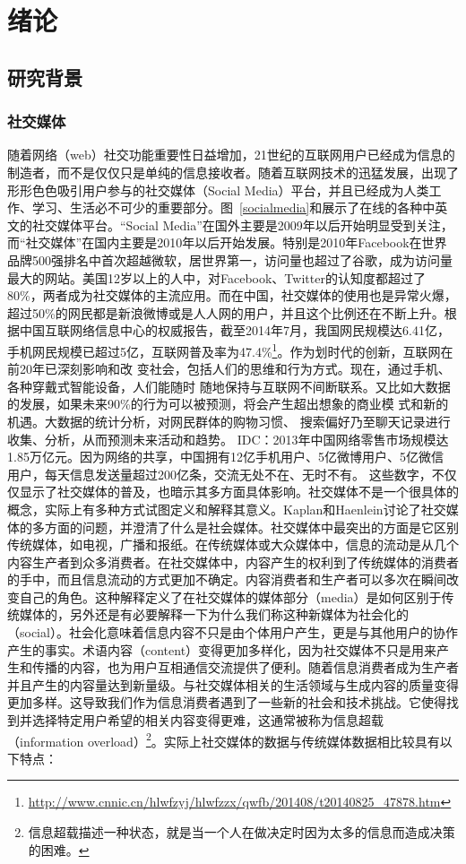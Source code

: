 \chapter{绪论}
\label{Intro}

\section{研究背景}

\subsection{社交媒体}
随着网络（web）社交功能重要性日益增加，21世纪的互联网用户已经成为信息的制造者，而不是仅仅只是单纯的信息接收者。随着互联网技术的迅猛发展，出现了形形色色吸引用户参与的社交媒体（Social Media）平台，并且已经成为人类工作、学习、生活必不可少的重要部分。图~\ref{socialmedia}和展示了在线的各种中英文的社交媒体平台。“Social Media”在国外主要是2009年以后开始明显受到关注，而“社交媒体”在国内主要是2010年以后开始发展。特别是2010年Facebook在世界品牌500强排名中首次超越微软，居世界第一，访问量也超过了谷歌，成为访问量最大的网站。美国12岁以上的人中，对Facebook、Twitter的认知度都超过了80\%，两者成为社交媒体的主流应用。而在中国，社交媒体的使用也是异常火爆，超过50\%的网民都是新浪微博或是人人网的用户，并且这个比例还在不断上升。根据中国互联网络信息中心的权威报告，截至2014年7月，我国网民规模达6.41亿，手机网民规模已超过5亿，互联网普及率为47.4\%\footnote{\url{http://www.cnnic.cn/hlwfzyj/hlwfzzx/qwfb/201408/t20140825_47878.htm}}。作为划时代的创新，互联网在前20年已深刻影响和改
变社会，包括人们的思维和行为方式。现在，通过手机、各种穿戴式智能设备，人们能随时 随地保持与互联网不间断联系。又比如大数据的发展，如果未来90\%的行为可以被预测，将会产生超出想象的商业模 式和新的机遇。大数据的统计分析，对网民群体的购物习惯、 搜索偏好乃至聊天记录进行收集、分析，从而预测未来活动和趋势。
IDC：2013年中国网络零售市场规模达1.85万亿元。因为网络的共享，中国拥有12亿手机用户、5亿微博用户、5亿微信 用户，每天信息发送量超过200亿条，交流无处不在、无时不有。
这些数字，不仅仅显示了社交媒体的普及，也暗示其多方面具体影响。社交媒体不是一个很具体的概念，实际上有多种方式试图定义和解释其意义。Kaplan和Haenlein讨论了社交媒体的多方面的问题，并澄清了什么是社会媒体。社交媒体中最突出的方面是它区别传统媒体，如电视，广播和报纸。在传统媒体或大众媒体中，信息的流动是从几个内容生产者到众多消费者。在社交媒体中，内容产生的权利到了传统媒体的消费者的手中，而且信息流动的方式更加不确定。内容消费者和生产者可以多次在瞬间改变自己的角色。这种解释定义了在社交媒体的媒体部分（media）是如何区别于传统媒体的，另外还是有必要解释一下为什么我们称这种新媒体为社会化的（social）。社会化意味着信息内容不只是由个体用户产生，更是与其他用户的协作产生的事实。术语内容（content）变得更加多样化，因为社交媒体不只是用来产生和传播的内容，也为用户互相通信交流提供了便利。随着信息消费者成为生产者并且产生的内容量达到新量级。与社交媒体相关的生活领域与生成内容的质量变得更加多样。这导致我们作为信息消费者遇到了一些新的社会和技术挑战。它使得找到并选择特定用户希望的相关内容变得更难，这通常被称为信息超载（information overload）\footnote{信息超载描述一种状态，就是当一个人在做决定时因为太多的信息而造成决策的困难。}。实际上社交媒体的数据与传统媒体数据相比较具有以下特点：
